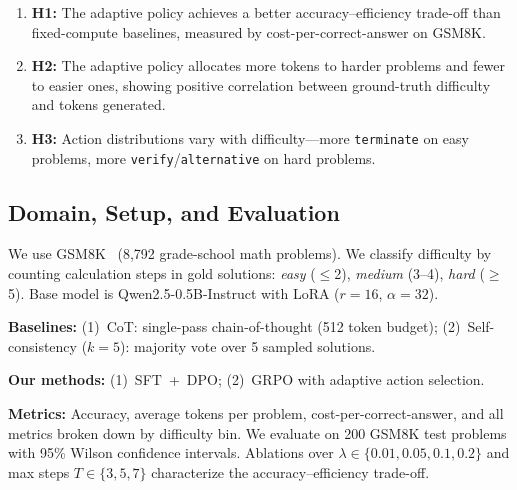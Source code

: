 \documentclass{article}
\begin{document}
\begin{enumerate}
    \item \textbf{H1:} The adaptive policy achieves a better accuracy--efficiency trade-off than fixed-compute baselines, measured by cost-per-correct-answer on GSM8K.
    \item \textbf{H2:} The adaptive policy allocates more tokens to harder problems and fewer to easier ones, showing positive correlation between ground-truth difficulty and tokens generated.
    \item \textbf{H3:} Action distributions vary with difficulty---more \texttt{terminate} on easy problems, more \texttt{verify}/\texttt{alternative} on hard problems.
\end{enumerate}

\subsection{Domain, Setup, and Evaluation}

We use GSM8K~\citep{cobbe2021gsm8k} (8,792 grade-school math problems). We classify difficulty by counting calculation steps in gold solutions: \emph{easy} ($\leq$2), \emph{medium} (3--4), \emph{hard} ($\geq$5). Base model is Qwen2.5-0.5B-Instruct with LoRA ($r{=}16$, $\alpha{=}32$).

\textbf{Baselines:} (1)~CoT: single-pass chain-of-thought (512 token budget); (2)~Self-consistency ($k{=}5$): majority vote over 5 sampled solutions.

\textbf{Our methods:} (1)~SFT~+~DPO; (2)~GRPO with adaptive action selection.

\textbf{Metrics:} Accuracy, average tokens per problem, cost-per-correct-answer, and all metrics broken down by difficulty bin. We evaluate on 200 GSM8K test problems with 95\% Wilson confidence intervals. Ablations over $\lambda \in \{0.01, 0.05, 0.1, 0.2\}$ and max steps $T \in \{3, 5, 7\}$ characterize the accuracy--efficiency trade-off.



\end{document}
